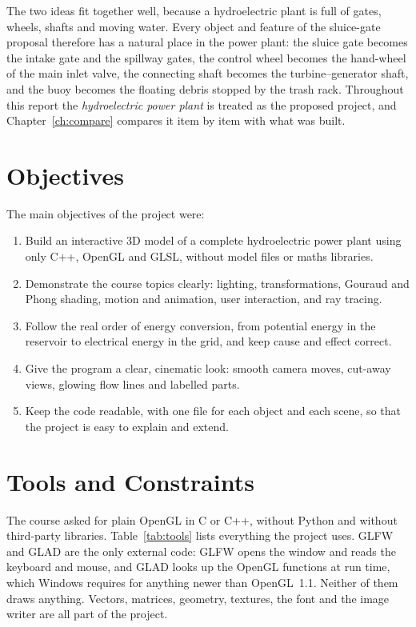 \documentclass[11pt,a4paper]{report}
\begin{document}
The two ideas fit together well, because a hydroelectric plant is full of gates,
wheels, shafts and moving water. Every object and feature of the sluice-gate
proposal therefore has a natural place in the power plant: the sluice gate becomes
the intake gate and the spillway gates, the control wheel becomes the hand-wheel of
the main inlet valve, the connecting shaft becomes the turbine--generator shaft, and
the buoy becomes the floating debris stopped by the trash rack. Throughout this
report the \emph{hydroelectric power plant} is treated as the proposed project, and
Chapter~\ref{ch:compare} compares it item by item with what was built.

\section{Objectives}

The main objectives of the project were:
\begin{enumerate}
  \item Build an interactive 3D model of a complete hydroelectric power plant using
        only C++, OpenGL and GLSL, without model files or maths libraries.
  \item Demonstrate the course topics clearly: lighting, transformations, Gouraud and
        Phong shading, motion and animation, user interaction, and ray tracing.
  \item Follow the real order of energy conversion, from potential energy in the
        reservoir to electrical energy in the grid, and keep cause and effect correct.
  \item Give the program a clear, cinematic look: smooth camera moves, cut-away
        views, glowing flow lines and labelled parts.
  \item Keep the code readable, with one file for each object and each scene, so that
        the project is easy to explain and extend.
\end{enumerate}

\section{Tools and Constraints}

The course asked for plain OpenGL in C or C++, without Python and without
third-party libraries. Table~\ref{tab:tools} lists everything the project uses. GLFW
and GLAD are the only external code: GLFW opens the window and reads the keyboard and
mouse, and GLAD looks up the OpenGL functions at run time, which Windows requires for
anything newer than OpenGL~1.1. Neither of them draws anything. Vectors, matrices,
geometry, textures, the font and the image writer are all part of the project.
\end{document}
